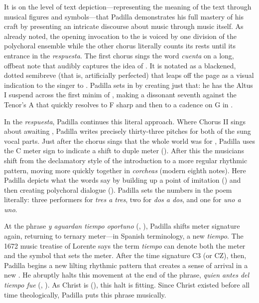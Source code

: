 It is on the level of text depiction---representing the meaning of the text
through musical figures and symbols---that Padilla demonstrates his full mastery
of his craft by presenting an intricate discourse about music through music
itself.
As already noted, the opening invocation to the  is voiced by one division of the polychoral
ensemble while the other chorus literally counts its rests until its entrance in
the \emph{respuesta}.
The first chorus sings the word \emph{cuenta} on a long, offbeat note that
audibly captures the idea of .
It is notated as a blackened, dotted semibreve (that is, artificially perfected)
that leaps off the page as a visual indication to the singer to .
Padilla sets  in  by creating
just that: he has the Altus I suspend across the first minim of ,
making a dissonant seventh against the Tenor's A that quickly resolves to F
sharp and then to a cadence on G in .

In the \emph{respuesta}, Padilla continues this literal approach.
Where Chorus II sings about awaiting , Padilla writes
precisely thirty-three pitches for both of the sung vocal parts.
Just after the chorus sings that the whole world was  for
, Padilla uses the C meter sign to indicate a shift to duple
meter ().
After this the musicians shift from the declamatory style of the introduction to
a more regular rhythmic pattern, moving more quickly together in \emph{corcheas}
(modern eighth notes).
Here Padilla depicts what the words say by building up a point of imitation
 () and then creating
polychoral dialogue ().
Padilla sets the numbers in the poem literally: three performers for \emph{tres
a tres}, two for \emph{dos a dos}, and one for \emph{uno a uno}.

At the phrase \emph{y aguardan tiempo oportuno} (, ), Padilla shifts meter signature again, returning
to ternary meter---in Spanish terminology, a new \emph{tiempo}.
The 1672 music treatise of Lorente says the term \emph{tiempo} can denote both
the meter and the symbol that sets the meter.%
    \Autocite[bk.~2, 149]{Lorente:Porque}
After the time signature C3 (or CZ), then, Padilla begins a new lilting rhythmic
pattern that creates a sense of arrival in a new .
He abruptly halts this movement at the end of the phrase, \emph{quien antes del
tiempo fue} (, ).
As Christ is  (), this halt is
fitting.  
Since Christ existed before all time theologically, Padilla puts this phrase
 musically.

